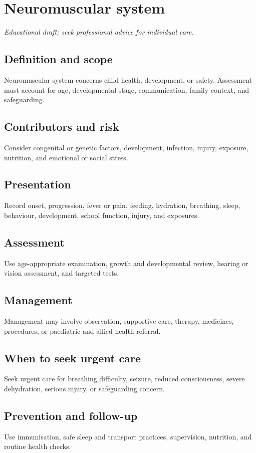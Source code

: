\chapter{Neuromuscular system}

\medskip
\noindent\textit{Educational draft; seek professional advice for individual care.}

\section*{Definition and scope}
Neuromuscular system concerns child health, development, or safety. Assessment must account for age, developmental stage, communication, family context, and safeguarding.

\section*{Contributors and risk}
Consider congenital or genetic factors, development, infection, injury, exposure, nutrition, and emotional or social stress.

\section*{Presentation}
Record onset, progression, fever or pain, feeding, hydration, breathing, sleep, behaviour, development, school function, injury, and exposures.

\section*{Assessment}
Use age-appropriate examination, growth and developmental review, hearing or vision assessment, and targeted tests.

\section*{Management}
Management may involve observation, supportive care, therapy, medicines, procedures, or paediatric and allied-health referral.

\section*{When to seek urgent care}
Seek urgent care for breathing difficulty, seizure, reduced consciousness, severe dehydration, serious injury, or safeguarding concern.

\section*{Prevention and follow-up}
Use immunisation, safe sleep and transport practices, supervision, nutrition, and routine health checks.

